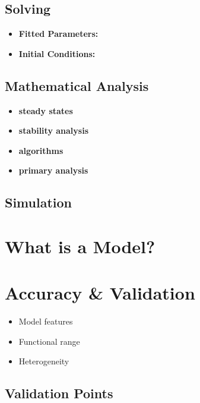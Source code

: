\documentclass[
]{book}
\begin{document}
\subsection{Solving}\label{solving-2}

\begin{itemize}
\item
  \textbf{Fitted Parameters:}
\item
  \textbf{Initial Conditions:}
\end{itemize}

\subsection{Mathematical Analysis}\label{mathematical-analysis}

\begin{itemize}
\item
  \textbf{steady states}
\item
  \textbf{stability analysis}
\item
  \textbf{algorithms}
\item
  \textbf{primary analysis}
\end{itemize}

\subsection{Simulation}\label{simulation}

\section{What is a Model?}\label{what-is-a-model}

\section{Accuracy \& Validation}\label{accuracy-validation}

\begin{itemize}
\item
  Model features
\item
  Functional range
\item
  Heterogeneity
\end{itemize}

\subsection{Validation Points}\label{validation-points}
\end{document}
